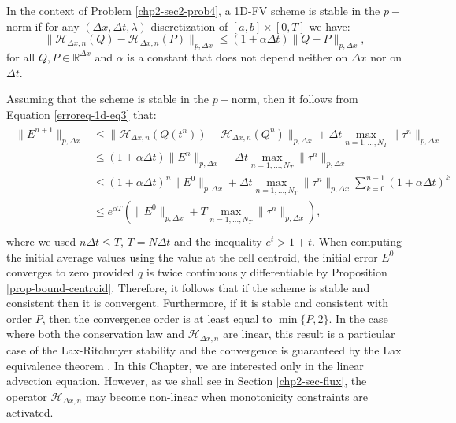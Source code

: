 \begin{definition}[Stability]
	In the context of Problem  \ref{chp2-sec2-prob4},
	a 1D-FV scheme is stable in the $p-$norm if for any $(\Delta x, \Delta t, \lambda)$-discretization of $[a,b]\times [0,T]$ we have:
	\begin{equation}
		\|\mathcal{H}_{\Delta x,n}(Q) - \mathcal{H}_{\Delta x,n}(P)\|_{p,\Delta x} \leq (1+\alpha \Delta t)  \|Q-P\|_{p,\Delta x},
	\end{equation}
	for all $Q, P \in \mathbb{R}^{\Delta x}$ and $\alpha$ is a constant
	that does not depend neither on $\Delta x$ nor on  $\Delta t$.
\end{definition}
Assuming that the scheme is stable in the $p-$norm, then it follows from Equation \eqref{erroreq-1d-eq3} that:
\begin{align}
	\label{chp2-sec2-erroreq}
	\begin{split}
		\|E^{n+1}\|_{p,\Delta x} 
		&\leq \|\mathcal{H}_{\Delta x,n}(Q(t^n)) - \mathcal{H}_{\Delta x,n}(Q^n)\|_{p,\Delta x} +  \Delta t \max_{n=1, \ldots, N_T}\|\tau^n\|_{p,\Delta x}\\
		&\leq (1+\alpha \Delta t)\|E^n\|_{p,\Delta x} +  \Delta t \max_{n=1, \ldots, N_T}\|\tau^n\|_{p,\Delta x}\\
		&\leq (1+\alpha \Delta t)^n\|E^0\|_{p,\Delta x} +  \Delta t \max_{n=1, \ldots, N_T}\|\tau^n\|_{p,\Delta x}
		\sum_{k=0}^{n-1} (1+\alpha \Delta t)^k\\
		&\leq e^{\alpha T}(\|E^0\|_{p,\Delta x} + T\max_{n=1, \ldots, N_T}\|\tau^n\|_{p,\Delta x}), \\
	\end{split}
\end{align}
where we used $n \Delta t\leq T $, $T=N\Delta t$ and the inequality $e^t> 1+t$.
When computing the initial average values using the value at the cell centroid, 
the initial error $E^0$ converges to zero provided $q$ is twice continuously differentiable
by Proposition \ref{prop-bound-centroid}.
Therefore, it follows that if the scheme is stable and consistent
then it is convergent. 
Furthermore, if it is stable and consistent with order $P$, then
the convergence order is at least equal to $\min\{{P,2}\}$.
In the case where both the conservation law and $\mathcal{H}_{\Delta x,n}$ are linear,
this result is a particular case of the Lax-Ritchmyer stability and the convergence
is guaranteed by the Lax equivalence theorem \citep{leveque:2002}.
In this Chapter, we are interested only in the linear advection equation.
However, as we shall see in Section \ref{chp2-sec-flux}, the operator $\mathcal{H}_{\Delta x,n}$
may become non-linear when monotonicity constraints are activated.

